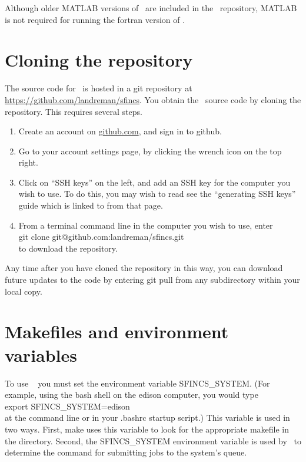 Although older {\ttfamily MATLAB} versions of \sfincs~are included in the \sfincs~repository,
{\ttfamily MATLAB} is not required for running the fortran version of \sfincs.

\section{Cloning the repository}

The source code for \sfincs~is hosted in a {\ttfamily git} repository at
\url{https://github.com/landreman/sfincs}.
You obtain the \sfincs~source code by cloning the repository. This requires several steps.

\begin{enumerate}
\item Create an account on \url{github.com}, and sign in to {\ttfamily github}.
\item Go to your account settings page, by clicking the wrench icon on the top right.
\item Click on ``SSH keys'' on the left, and add an SSH key for the computer you wish to use. To do this, you may wish to read see the ``generating SSH keys'' guide which is linked to from that page.
\item From a terminal command line in the computer you wish to use, enter\\
{\ttfamily git clone git@github.com:landreman/sfincs.git}\\
 to download the repository.
\end{enumerate}

Any time after you have cloned the repository in this way, you can download future updates to the code by entering {\ttfamily git pull} from any subdirectory within your local copy.

\section{Makefiles and environment variables}

To use \sfincs~ you must set the environment variable {\ttfamily SFINCS\_SYSTEM}.
(For example, using the {\ttfamily bash} shell on the {\ttfamily edison}
computer, you would type\\
{\ttfamily export SFINCS\_SYSTEM=edison}\\
 at the command line
or in your {\ttfamily .bashrc} startup script.)
This variable is used in two ways. 
First, {\ttfamily make} uses this variable to look for the 
appropriate makefile in the
 directory.  Second, the {\ttfamily SFINCS\_SYSTEM} environment
variable is used by
\sfincsScan~to determine the command for submitting jobs to the system's queue.

